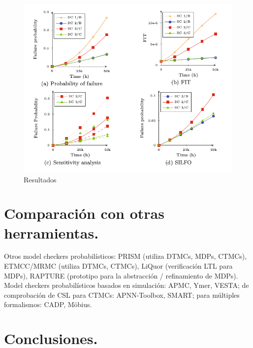 \documentclass[11pt]{article}
\begin{document}
\begin{figure}[h]
	\includegraphics[scale=0.5]{results.png}
	\centering
	\caption{Resultados}
\end{figure}

\section{Comparaci\'on con otras herramientas.}

Otros model checkers probabil\'isticos: PRISM (utiliza DTMCs, MDPs, CTMCs), ETMCC/MRMC (utiliza DTMCs, CTMCs), LiQuor (verificaci\'on LTL para MDPs), RAPTURE (prototipo para la abstracci\'on / refinamiento de MDPs). Model checkers probabil\'isticos basados en simulaci\'on: APMC, Ymer, VESTA; de comprobaci\'on de CSL para CTMCs: APNN-Toolbox, SMART; para m\'ultiples formalismos: CADP, M\"{o}bius.

\section{Conclusiones.}
\end{document}
